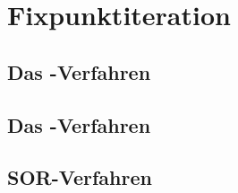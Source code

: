 \section{Fixpunktiteration}

\subsection{Das -Verfahren}

\subsection{Das -Verfahren}

\subsection{SOR-Verfahren}